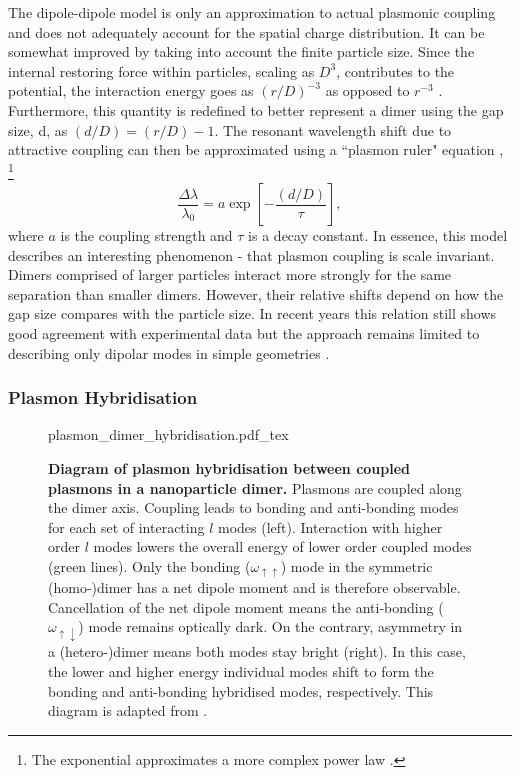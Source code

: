\documentclass{article}
\begin{document}
The dipole-dipole model is only an approximation to actual plasmonic coupling and does not adequately account for the spatial charge distribution. It can be somewhat improved by taking into account the finite particle size. Since the internal restoring force within particles, scaling as $D^3$, contributes to the potential, the interaction energy goes as $(r/D)^{-3}$ as opposed to $r^{-3}$ \cite{jain2007}. Furthermore, this quantity is redefined to better represent a dimer using the gap size, \gls{d}, as $(d/D) = (r/D)-1$. The resonant wavelength shift due to attractive coupling can then be approximated using a ``plasmon ruler" equation \cite{jain2007, ben2011},%
\footnote{The exponential approximates a more complex power law \cite{kadkhodazadeh2014scaling}.}
\begin{equation}
	\frac{\Delta\lambda}{\lambda_0} = a\exp{\left[-\frac{(d/D)}{\tau}\right]},
	\label{eq:plasmon_ruler}
\end{equation}
where $a$ is the coupling strength and $\tau$ is a decay constant. In essence, this model describes an interesting phenomenon - that plasmon coupling is scale invariant. Dimers comprised of larger particles interact more strongly for the same separation than smaller dimers. However, their relative shifts depend on how the gap size compares with the particle size. In recent years this relation still shows good agreement with experimental data but the approach remains limited to describing only dipolar modes in simple geometries \cite{muskens2007}.

\FloatBarrier
\subsubsection{Plasmon Hybridisation}

\begin{figure}[bt]
\centering
\fontsize{10pt}{1em}\selectfont
\def\svgwidth{0.98\textwidth}
{plasmon_dimer_hybridisation.pdf_tex}
\caption[Diagram of plasmon hybridisation between coupled plasmons in a nanoparticle dimer]{\textbf{Diagram of plasmon hybridisation between coupled plasmons in a nanoparticle dimer.} Plasmons are coupled along the dimer axis. Coupling leads to bonding and anti-bonding modes for each set of interacting $l$ modes (left). Interaction with higher order $l$ modes lowers the overall energy of lower order coupled modes (green lines). Only the bonding ($\omega_{\uparrow\uparrow}$) mode in the symmetric (homo-)dimer has a net dipole moment and is therefore observable. Cancellation of the net dipole moment means the anti-bonding ($\omega_{\uparrow\downarrow}$) mode remains optically dark. On the contrary, asymmetry in a (hetero-)dimer means both modes stay bright (right). In this case, the lower and higher energy individual modes shift to form the bonding and anti-bonding hybridised modes, respectively. This diagram is adapted from \cite{nordlander2004}.}
\label{fig:plasmon_hybridisation}
\end{figure}
\end{document}
